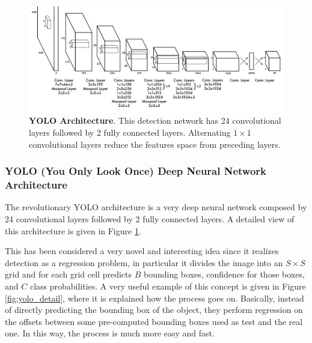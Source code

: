 \begin{figure}
    \centering
    \includegraphics[width=\textwidth]{figures/1_perception_and_sensing_in_robotics/yolo_architecture}
    \caption{\textbf{YOLO Architecture}. This detection network has 24 convolutional layers followed by 2 fully connected layers. Alternating $1 \times 1$ convolutional layers reduce the features space from preceding layers.} 
    \label{fig:yolo_architecture}
\end{figure}

\subsubsection{YOLO (You Only Look Once) Deep Neural Network Architecture}\label{subsubsec:yolo}
The revolutionary YOLO architecture is a very deep neural network composed by 24 convolutional layers followed by 2 fully connected layers. A detailed view of this architecture is given in Figure \ref{fig:yolo_architecture}.

This has been considered a very novel and interesting idea since it realizes detection as a regression problem, in particular it divides the image into an $S \times S$ grid and for each grid cell predicts $B$ bounding boxes, confidence for those boxes, and $C$ class probabilities. A very useful example of this concept is given in Figure \ref{fig:yolo_detail}, where it is explained how the process goes on. Basically, instead of directly predicting the bounding box of the object, they perform regression on the offsets between some pre-computed bounding boxes used as test and the real one. In this way, the process is much more easy and fast.

